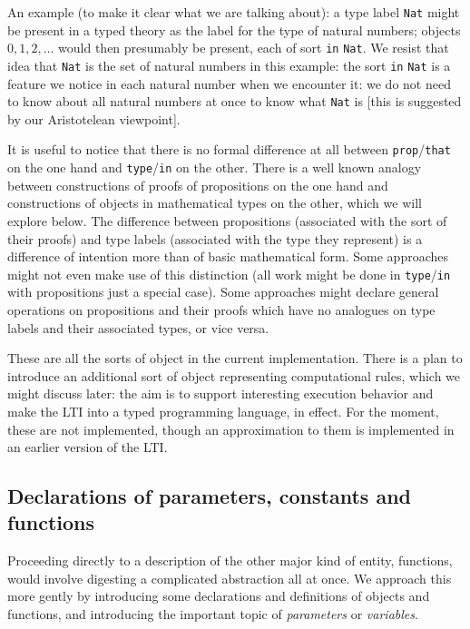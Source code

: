 \documentclass[12pt]{article}
\begin{document}
An example (to make it clear what we are talking about):  a type label {\tt Nat} might be present in a typed theory
as the label for the type of natural numbers;  objects $0,1,2,\ldots$ would then presumably be present, each of sort
{\tt in} {\tt Nat}.  We resist that idea that {\tt Nat} is the set of natural numbers in this example:  the sort
{\tt in} {\tt Nat} is a feature we notice in each natural number when we encounter it:  we do not need to know about all natural numbers at once to know what {\tt Nat} is [this is suggested by our Aristotelean viewpoint].

It is useful to notice that there is no formal difference at all between {\tt prop}/{\tt that} on the one hand and {\tt type}/{\tt in} on the other.  There is a well known analogy between constructions of proofs of propositions on the one hand
and constructions of objects in mathematical types on the other, which we will explore below.  The difference between propositions (associated with the sort of their proofs) and type labels (associated with the type they represent) is a difference of intention more than of basic mathematical form.  Some approaches might not even make use of this distinction
(all work might be done in {\tt type}/{\tt in} with propositions just a special case).  Some approaches might declare general operations on propositions and their proofs which have no analogues on type labels and their associated types, or vice versa.

These are all the sorts of object in the current implementation.  There is a plan to introduce an additional sort of object representing computational rules, which we might discuss later:  the aim is to support interesting execution behavior and make the LTI into a typed programming language, in effect.  For the moment, these are not implemented, though an approximation to them is implemented in an earlier version of the LTI.

\newpage

\subsection{Declarations of parameters, constants and functions}

Proceeding directly to a description of the other major kind of entity, functions, would involve digesting a complicated abstraction all at once.  We approach this more gently by introducing some declarations and definitions of objects and functions, and introducing the important topic of {\em parameters\/} or {\em variables\/}.
\end{document}
